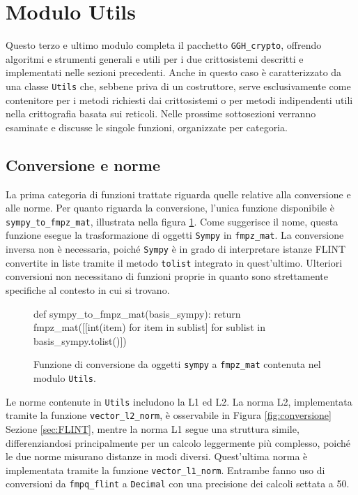 \section{Modulo Utils}
\label{sec:moduloutils}

Questo terzo e ultimo modulo completa il pacchetto \texttt{GGH\_crypto}, offrendo algoritmi 
e strumenti generali e utili per i due crittosistemi descritti e implementati nelle sezioni 
precedenti. 
Anche in questo caso è caratterizzato da una classe \texttt{Utils} che,
sebbene priva di un costruttore, serve esclusivamente come contenitore per i metodi 
richiesti dai crittosistemi o per metodi indipendenti utili nella crittografia basata 
sui reticoli. Nelle prossime sottosezioni verranno esaminate e discusse le singole
funzioni, organizzate per categoria. 

\subsection{Conversione e norme}

La prima categoria di funzioni trattate riguarda quelle relative alla conversione e 
alle norme. Per quanto riguarda la conversione, l'unica funzione disponibile è 
\texttt{sympy\_to\_fmpz\_mat}, illustrata nella figura \ref{fig:utilsconversion}.
Come suggerisce il nome, questa funzione esegue la trasformazione di 
oggetti \texttt{Sympy} in \texttt{fmpz\_mat}. La conversione inversa non è 
necessaria, poiché \texttt{Sympy} è in grado di interpretare istanze FLINT 
convertite in liste tramite il metodo \texttt{tolist} integrato in quest'ultimo.
Ulteriori conversioni non necessitano di funzioni proprie in quanto sono strettamente 
specifiche al contesto in cui si trovano. 
\begin{figure}[h]
    \begin{python}
        def sympy_to_fmpz_mat(basis_sympy):
            return fmpz_mat([[int(item) for item in sublist] 
                    for sublist in basis_sympy.tolist()])
    \end{python}
    \caption{Funzione di conversione da oggetti \texttt{sympy} a \texttt{fmpz\_mat} 
    contenuta nel modulo \texttt{Utils}.}
    \label{fig:utilsconversion}
\end{figure}

Le norme contenute in \texttt{Utils} includono la L1 ed L2. La norma 
L2, implementata tramite la funzione \texttt{vector\_l2\_norm}, è osservabile 
in Figura \ref{fig:conversione} Sezione \ref{sec:FLINT}, 
mentre la norma L1 segue una struttura simile, differenziandosi principalmente per un 
calcolo leggermente più complesso, poiché le due norme misurano distanze in modi diversi.
Quest'ultima norma è implementata tramite la funzione \texttt{vector\_l1\_norm}. 
Entrambe fanno uso di conversioni da \texttt{fmpq\_flint} a \texttt{Decimal} con una 
precisione dei calcoli settata a 50. 

